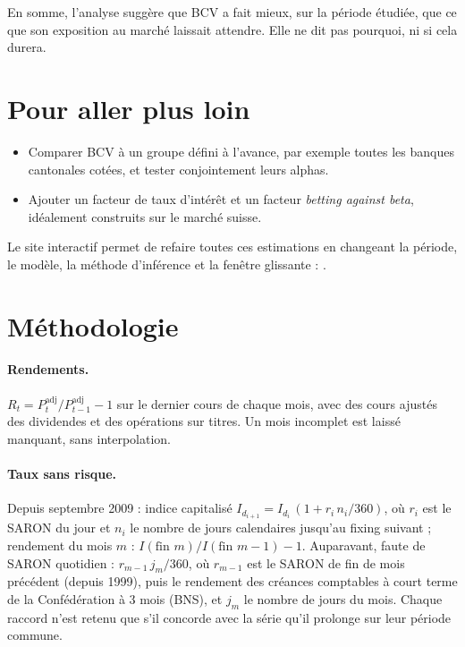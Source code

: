 \documentclass[11pt,a4paper]{article}
\begin{document}
En somme, l'analyse suggère que BCV a fait mieux, sur la période étudiée, que ce que son exposition au marché laissait attendre. Elle ne dit pas pourquoi, ni si cela durera.

\section{Pour aller plus loin}

\begin{itemize}[leftmargin=*]
  \item Comparer BCV à un groupe défini à l'avance, par exemple toutes les banques cantonales cotées, et tester conjointement leurs alphas.
  \item Ajouter un facteur de taux d'intérêt et un facteur \emph{betting against beta}, idéalement construits sur le marché suisse.
\end{itemize}

Le site interactif permet de refaire toutes ces estimations en changeant la période, le modèle, la méthode d'inférence et la fenêtre glissante : \URLSite.

\appendix
\section{Méthodologie}

\paragraph{Rendements.} $R_t = P^{\text{adj}}_t / P^{\text{adj}}_{t-1} - 1$ sur le dernier cours de chaque mois, avec des cours ajustés des dividendes et des opérations sur titres. Un mois incomplet est laissé manquant, sans interpolation.

\paragraph{Taux sans risque.} Depuis septembre 2009 : indice capitalisé $I_{d_{i+1}} = I_{d_i}\,(1 + r_i\, n_i/360)$, où $r_i$ est le SARON du jour et $n_i$ le nombre de jours calendaires jusqu'au fixing suivant ; rendement du mois $m$ : $I(\text{fin } m)/I(\text{fin } m-1) - 1$. Auparavant, faute de SARON quotidien : $r_{m-1}\, j_m/360$, où $r_{m-1}$ est le SARON de fin de mois précédent (depuis 1999), puis le rendement des créances comptables à court terme de la Confédération à 3 mois (BNS), et $j_m$ le nombre de jours du mois. Chaque raccord n'est retenu que s'il concorde avec la série qu'il prolonge sur leur période commune.
\end{document}
